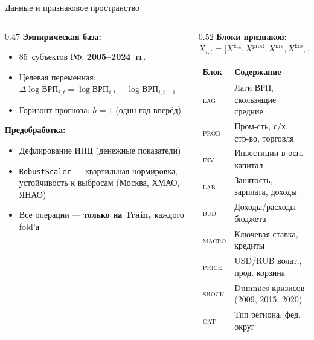 \documentclass[aspectratio=169,10pt]{beamer}
\begin{document}
\begin{frame}{Данные и признаковое пространство}
\begin{columns}[T]
  \begin{column}{0.47\textwidth}
    \textbf{\color{hsedark}Эмпирическая база:}
    \begin{itemize}
      \item 85~субъектов РФ, \textbf{2005–2024~гг.}
      \item Целевая переменная:
            $\Delta\log\text{ВРП}_{i,t} = \log\text{ВРП}_{i,t} - \log\text{ВРП}_{i,t-1}$
      \item Горизонт прогноза: $h=1$ (один год вперёд)
    \end{itemize}
    \vspace{0.3em}
    \textbf{\color{hsedark}Предобработка:}
    \begin{itemize}
      \item Дефлирование ИПЦ (денежные показатели)
      \item \texttt{RobustScaler} — квартильная нормировка,
            устойчивость к выбросам (Москва, ХМАО, ЯНАО)
      \item Все операции — \textbf{только на Train}$_k$ каждого fold'а
    \end{itemize}
  \end{column}
  \begin{column}{0.52\textwidth}
    \textbf{\color{hsedark}Блоки признаков:}\\[0.2em]
    {\scriptsize$X_{i,t} {=} \bigl[X^{\text{lag}},X^{\text{prod}},X^{\text{inv}},
     X^{\text{lab}},X^{\text{bud}},X^{\text{macro}},X^{\text{price}},
     X^{\text{shock}},X^{\text{cat}}\bigr]$}
    \vspace{0.1em}
    {\scriptsize
    \begin{tabular}{@{}lp{3.6cm}@{}}
      \toprule
      Блок & Содержание \\
      \midrule
      \textsc{lag}   & Лаги ВРП, скользящие средние \\
      \textsc{prod}  & Пром-сть, с/х, стр-во, торговля \\
      \textsc{inv}   & Инвестиции в осн. капитал \\
      \textsc{lab}   & Занятость, зарплата, доходы \\
      \textsc{bud}   & Доходы/расходы бюджета \\
      \textsc{macro} & Ключевая ставка, кредиты \\
      \textsc{price} & USD/RUB волат., прод. корзина \\
      \textsc{shock} & Dummies кризисов (2009, 2015, 2020) \\
      \textsc{cat}   & Тип региона, фед. округ \\
      \bottomrule
    \end{tabular}}
  \end{column}
\end{columns}
\end{frame}
\end{document}
